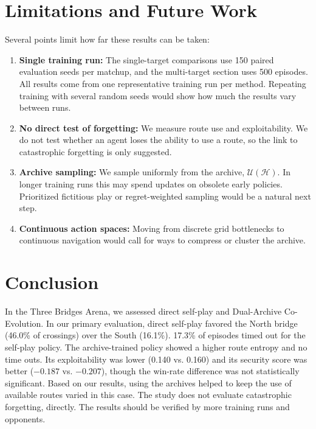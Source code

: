 \documentclass[conference]{IEEEtran}
\begin{document}
\section{Limitations and Future Work}
Several points limit how far these results can be taken:
\begin{enumerate}
    \item \textbf{Single training run:} The single-target comparisons use 150 paired evaluation seeds per matchup, and the multi-target section uses 500 episodes. All results come from one representative training run per method. Repeating training with several random seeds would show how much the results vary between runs.
    \item \textbf{No direct test of forgetting:} We measure route use and exploitability. We do not test whether an agent loses the ability to use a route, so the link to catastrophic forgetting is only suggested.
    \item \textbf{Archive sampling:} We sample uniformly from the archive, $\mathcal{U}(\mathcal{H})$. In longer training runs this may spend updates on obsolete early policies. Prioritized fictitious play or regret-weighted sampling would be a natural next step.
    \item \textbf{Continuous action spaces:} Moving from discrete grid bottlenecks to continuous navigation would call for ways to compress or cluster the archive.
\end{enumerate}

\section{Conclusion}
In the Three Bridges Arena, we assessed direct self-play and Dual-Archive Co-Evolution. In our primary evaluation, direct self-play favored the North bridge (46.0\% of crossings) over the South (16.1\%). 17.3\% of episodes timed out for the self-play policy. The archive-trained policy showed a higher route entropy and no time outs. Its exploitability was lower (0.140 vs. 0.160) and its security score was better ($-0.187$ vs. $-0.207$), though the win-rate difference was not statistically significant. Based on our results, using the archives helped to keep the use of available routes varied in this case. The study does not evaluate catastrophic forgetting, directly. The results should be verified by more training runs and opponents.

\appendices
\end{document}
